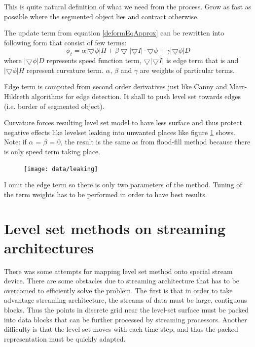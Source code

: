 This is quite natural definition of what we need from the process.
Grow as fast as possible where the segmented object lies and contract otherwise.

The update term from equation \ref{deformEqApprox} can be rewritten into following form that consist of few terms:
\begin{equation}
\phi_t = \alpha |\bigtriangledown \phi| H + \beta
\bigtriangledown|\bigtriangledown I|\cdot \bigtriangledown \phi +
\gamma|\bigtriangledown \phi|D
\end{equation}
where $|\bigtriangledown \phi|D$ represents speed function term, $\bigtriangledown|\bigtriangledown I|$ is edge term that is and $|\bigtriangledown \phi| H$ represent curvature term. $\alpha$, $\beta$ and $\gamma$ are weights of particular terms.

Edge term is computed from second order derivatives just like Canny and Marr-Hildreth algorithms for edge detection.
It shall to push level set towards edges (i.e. border of segmented object).

Curvature forces resulting level set model to have less surface and thus protect negative effects like levelset leaking into unwanted places like figure \ref{fg:leaking} shows.
Note: if $\alpha$ = $\beta$ = 0, the result is the same as from flood-fill method because there is only speed term taking place.

\begin{figure}
    \centering
    \texttt{[image: data/leaking]}
    \caption[Leaking of segmentation into unwanted places]{}
    \label{fg:leaking}
\end{figure}

I omit the edge term so there is only two parameters of the method.
Tuning of the term weights has to be performed in order to have best results.

\section{Level set methods on streaming architectures}

\par
There was some attempts for mapping level set method onto special stream device.
There are some obstacles due to streaming architecture that has to be overcomed to efficiently solve the problem.
The first is that in order to take advantage streaming architecture, the streams of data must be large, contiguous blocks.
Thus the points in discrete grid near the level-set surface must be packed into data blocks that can be further processed by streaming processors.
Another difficulty is that the level set moves with each time step, and thus the packed representation must be quickly adapted.

